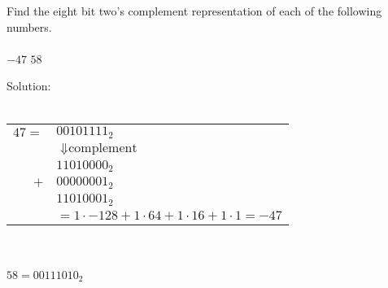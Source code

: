 Find the eight bit two's complement representation of each of the following numbers. \\
\\
$-47$
$58$

Solution: \\
\\
\begin{tabular}{rl}
  $47 =$ & $00101111_2$\\
         & $\Downarrow \textrm{complement}$\\
         & $11010000_2$\\
     $+$ & $00000001_2$\\
         & $11010001_2$\\
         & $= 1 \cdot -128 + 1 \cdot 64 + 1 \cdot 16 + 1 \cdot 1 = -47$
\end{tabular}\\
\\
$58 = 00111010_2$
